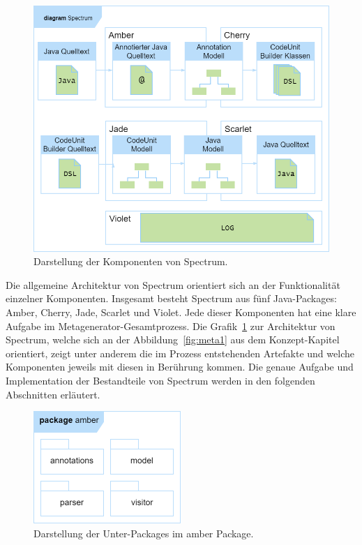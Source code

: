 \documentclass[12pt,oneside,a4paper,parskip]{scrbook}
\begin{document}
\begin{figure}[htbp]
	\centering
	\includegraphics[width=1.0\textwidth]{bilder/spectrumPackages}
	\caption{Darstellung der Komponenten von Spectrum.}
	\label{fig:spectrumPackages}
\end{figure}

Die allgemeine Architektur von Spectrum orientiert sich an der Funktionalität einzelner Komponenten. Insgesamt besteht Spectrum aus fünf Java-Packages: Amber, Cherry, Jade, Scarlet und Violet. Jede dieser Komponenten hat eine klare Aufgabe im Metagenerator-Gesamtprozess. Die Grafik~\ref{fig:spectrumPackages} zur Architektur von Spectrum, welche sich an der Abbildung~\ref{fig:meta1} aus dem Konzept-Kapitel orientiert, zeigt unter anderem die im Prozess entstehenden Artefakte und welche Komponenten jeweils mit diesen in Berührung kommen. Die genaue Aufgabe und Implementation der Bestandteile von Spectrum werden in den folgenden Abschnitten erläutert.

\begin{figure}[htbp]
	\centering
	\includegraphics[width=0.5\textwidth]{bilder/amber}
	\caption{Darstellung der Unter-Packages im amber Package.}
	\label{fig:amberPackages}
\end{figure}
\end{document}

